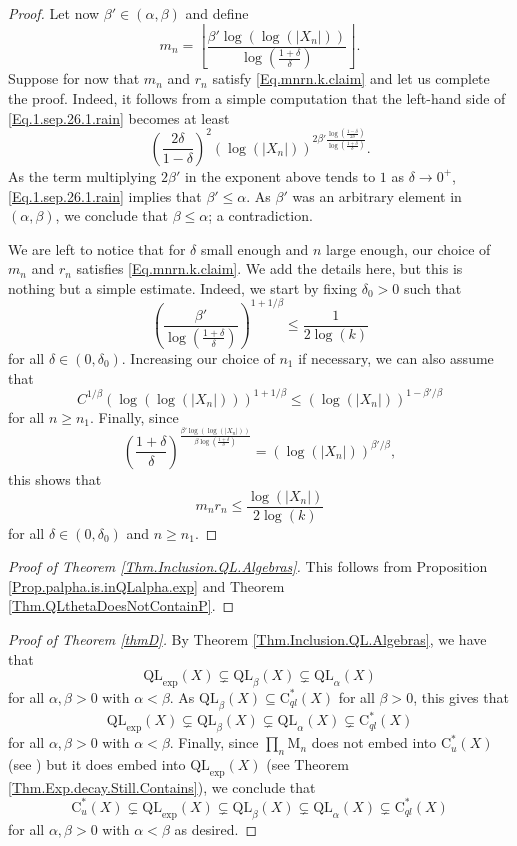 \documentclass[11pt]{amsart}
\newcommand{\cstu}{\mathrm{C}^*_u}
\newcommand{\cstql}{\mathrm{C}^*_{\textit{ql}}}
\numberwithin{equation}{section}
\theoremstyle{definition}
\theoremstyle{remark}
\begin{document}
\begin{proof}
Let now $\beta'\in (\alpha,\beta)$ and define
\[m_n=\left\lfloor \frac{\beta'\log(\log(|X_n|))}{\log\left(\frac{1+\delta}{\delta}\right)}\right\rfloor.\]
Suppose for now that $m_n$ and $r_n$ satisfy \eqref{Eq.mnrn.k.claim} and let us complete the proof. Indeed, it follows from a simple computation that the  left-hand side of
\eqref{Eq.1.sep.26.1.rain} becomes at least
\[\left(\frac{2\delta}{1-\delta}\right)^2(\log(|X_n|))^{2\beta'\frac{\log\left(\frac{1-\delta}{2\delta}\right)}{\log\left(\frac{1+\delta}{\delta}\right)}}.\]
As the term multiplying $2\beta'$ in the exponent above tends to $1$ as $\delta\to 0^ +$, \eqref{Eq.1.sep.26.1.rain} implies that $\beta'\leq \alpha$. As $\beta'$ was an arbitrary element in $(\alpha,\beta)$, we conclude that $\beta\leq \alpha$; a contradiction.




We are left to notice that for $\delta$ small enough and $n$ large enough, our choice of $m_n$ and $r_n$   satisfies \eqref{Eq.mnrn.k.claim}. We add the details here, but this is nothing but a simple estimate. Indeed, we start by fixing   $\delta_0>0$  such that
\[ \left(\frac{\beta'}{\log\left(\frac{1+\delta}{\delta}\right)}\right)^{1+1/\beta}\leq \frac{1}{2\log(k)}\]
for all $\delta\in (0,\delta_0)$. Increasing our choice of $n_1$ if necessary, we can also assume that
\[ C^{1/\beta}(\log(\log(|X_n|)))^{1+1/\beta}\leq (\log(|X_n|))^{1-\beta'/\beta}\]
for all $n\geq n_1$. Finally, since
\[\left(\frac{1+\delta}{\delta}\right)^{\frac{\beta'\log(\log(|X_n|))}{\beta \log\left(\frac{1+\delta}{\delta}\right)}}= (\log(|X_n|))^{\beta'/\beta},\]
this shows that
\[m_nr_n\leq \frac{\log(|X_n|)}{2\log(k)}\]
for all $\delta\in (0,\delta_0)$ and $n\geq n_1$.
\end{proof}

  \begin{proof}
      [Proof of Theorem \ref{Thm.Inclusion.QL.Algebras}]
      This follows from Proposition \ref{Prop.palpha.is.inQLalpha.exp} and Theorem \ref{Thm.QLthetaDoesNotContainP}.
  \end{proof}

\begin{proof}
    [Proof of Theorem \ref{thmD}]
    By Theorem \ref{Thm.Inclusion.QL.Algebras}, we have that 
    \[\mathrm{QL}_{\exp}(X)\subsetneq \mathrm{QL}_{\beta}(X)\subsetneq \mathrm{QL}_{\alpha}(X)\]
    for all $\alpha,\beta>0$ with $\alpha<\beta$. As $\mathrm{QL}_{\beta}(X)\subseteq\cstql(X)$ for all $\beta>0$, this gives that 
        \[\mathrm{QL}_{\exp}(X)\subsetneq \mathrm{QL}_{\beta}(X)\subsetneq \mathrm{QL}_{\alpha}(X)\subsetneq \cstql(X)\]
    for all $\alpha,\beta>0$ with $\alpha<\beta$. Finally, since $\prod_n\mathrm M_n$ does not embed into $\cstu(X)$ (see \cite[Theorem A]{Ozawa2023}) but it does embed into $\mathrm{QL}_{\exp}(X)$ (see Theorem \ref{Thm.Exp.decay.Still.Contains}), we conclude that 
    \[\cstu(X)\subsetneq \mathrm{QL}_{\exp}(X)\subsetneq \mathrm{QL}_{\beta}(X)\subsetneq \mathrm{QL}_{\alpha}(X)\subsetneq \cstql(X)\]
    for all $\alpha,\beta>0$ with $\alpha<\beta$ as desired.
\end{proof}
\end{document}
